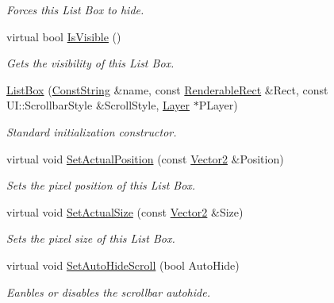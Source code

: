 \begin{DoxyCompactItemize}
\begin{DoxyCompactList}\small\item\em Forces this List Box to hide. \item\end{DoxyCompactList}\item 
virtual bool \hyperlink{classphys_1_1UI_1_1ListBox_a638f19eb6e5a0bd3291fab1ebaccc84f}{IsVisible} ()
\begin{DoxyCompactList}\small\item\em Gets the visibility of this List Box. \item\end{DoxyCompactList}\item 
\hyperlink{classphys_1_1UI_1_1ListBox_a2c61aa8ff40ff66eb45388a4e6cca5b2}{ListBox} (\hyperlink{namespacephys_a5ce5049f8b4bf88d6413c47b504ebb31}{ConstString} \&name, const \hyperlink{structphys_1_1UI_1_1RenderableRect}{RenderableRect} \&Rect, const UI::ScrollbarStyle \&ScrollStyle, \hyperlink{classphys_1_1UI_1_1Layer}{Layer} $\ast$PLayer)
\begin{DoxyCompactList}\small\item\em Standard initialization constructor. \item\end{DoxyCompactList}\item 
virtual void \hyperlink{classphys_1_1UI_1_1ListBox_a4bf1911c639429c783915ba8a543fec3}{SetActualPosition} (const \hyperlink{classphys_1_1Vector2}{Vector2} \&Position)
\begin{DoxyCompactList}\small\item\em Sets the pixel position of this List Box. \item\end{DoxyCompactList}\item 
virtual void \hyperlink{classphys_1_1UI_1_1ListBox_a742810da75f2b3889794498f05af8860}{SetActualSize} (const \hyperlink{classphys_1_1Vector2}{Vector2} \&Size)
\begin{DoxyCompactList}\small\item\em Sets the pixel size of this List Box. \item\end{DoxyCompactList}\item 
virtual void \hyperlink{classphys_1_1UI_1_1ListBox_a60fc5c1907df6d83217b25c2c8f15f48}{SetAutoHideScroll} (bool AutoHide)
\begin{DoxyCompactList}\small\item\em Eanbles or disables the scrollbar autohide. \item\end{DoxyCompactList}\item 

\end{DoxyCompactItemize}
